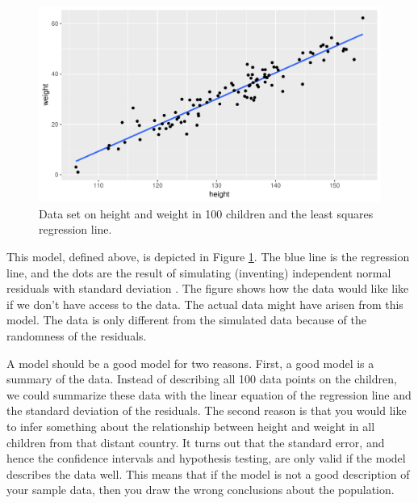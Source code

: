 \documentclass[]{book}\usepackage[]{graphicx}\usepackage[]{color}
\makeatletter
\def\maxwidth{ %
  \ifdim\Gin@nat@width>\linewidth
    \linewidth
  \else
    \Gin@nat@width
  \fi
}
\newenvironment{knitrout}{}{} %
\makeatother
\begin{document}
\begin{knitrout}
\color{fgcolor}\begin{figure}

{\centering \includegraphics[width=\maxwidth]{figure/ass_2-1} 

}

\caption[Data set on height and weight in 100 children and the least squares regression line]{Data set on height and weight in 100 children and the least squares regression line.}\label{fig:ass_2}
\end{figure}


\end{knitrout}


This model, defined above, is depicted in Figure \ref{fig:ass_2}. The blue line is the regression line, and the dots are the result of simulating (inventing) independent normal residuals with standard deviation . The figure shows how the data would like like if we don't have access to the data. 
The actual data might have arisen from this model. The data is only different from the simulated data because of the randomness of the residuals. 

A model should be a good model for two reasons. First, a good model is a summary of the data. Instead of describing all 100 data points on the children, we could summarize these data with the linear equation of the regression line and the standard deviation of the residuals. The second reason is that you would like to infer something about the relationship between height and weight in all children from that distant country. It turns out that the standard error, and hence the confidence intervals  and hypothesis testing, are only valid if the model describes the data well. This means that if the model is not a good description of your sample data, then you draw the wrong conclusions about the population.
\end{document}
